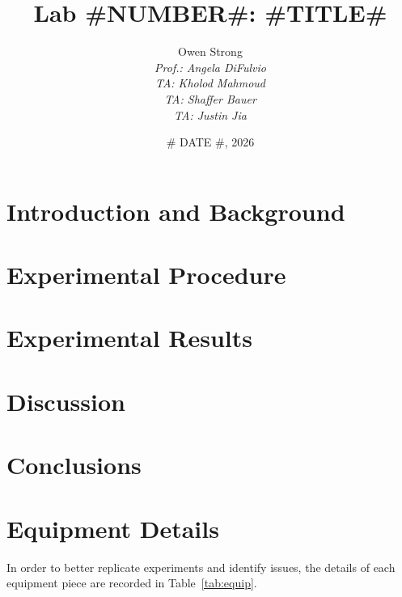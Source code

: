 \documentclass[12pt]{article}
\title{Lab #NUMBER#: #TITLE#}
\author{Owen Strong \\
\itshape Prof.: Angela DiFulvio\\
\itshape TA: Kholod Mahmoud \\
\itshape TA: Shaffer Bauer \\
\itshape TA: Justin Jia \\
}
\date{# DATE #, 2026}
\begin{document}
\maketitle
\pagebreak
{\hypersetup{linkcolor=black}\tableofcontents}
\pagebreak
{}
\begin{abstract}

\end{abstract}

\section{Introduction and Background}

\section{Experimental Procedure}\label{sec:methods}
\section{Experimental Results}\label{sec:results}


\section{Discussion}\label{sec:disc}
\section{Conclusions}\label{sec:conc}

% 
\pagebreak\printbibliography

\appendix
\pagebreak
\FloatBarrier\section{Equipment Details}\label{app:equip}
In order to better replicate experiments and identify issues, the details of each equipment piece are recorded in Table~\ref{tab:equip}.
\end{document}
